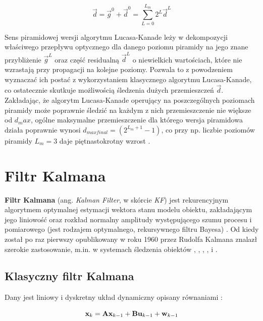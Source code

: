 \begin{equation}
\label{Piramidowy_algorytm_Lucasa_Kanade_wynik_koncowy}
	\vec{d} = \vec{g}^0 + \vec{d}^0 = \sum_{L = 0}^{L_m} 2^L \vec{d}^L
\end{equation}

Sens piramidowej wersji algorytmu Lucasa-Kanade leży w dekompozycji właściwego przepływu optycznego dla danego poziomu piramidy na jego znane przybliżenie $\vec{g}^L$ oraz część residualną $\vec{d}^L$ o niewielkich wartościach, które nie wzrastają przy propagacji na kolejne poziomy. Pozwala to z powodzeniem wyznaczać ich postać z wykorzystaniem klasycznego algorytmu Lucasa-Kanade, co ostatecznie skutkuje możliwością śledzenia dużych przemieszczeń $\vec{d}$. Zakładając, że algorytm Lucasa-Kanade operujący na poszczególnych poziomach piramidy może poprawnie śledzić na każdym z nich  przemieszczenie nie większe od $d_max$, ogólne maksymalne przemieszczenie dla którego wersja piramidowa działa poprawnie wynosi $d_{max final} = (2^{L_m+1}-1)$, co przy np. liczbie poziomów piramidy $L_m = 3$ daje piętnastokrotny wzrost \cite{Bouguet2000}.

\section{Filtr Kalmana}
\label{sec:Filtr_Kalmana}

\textbf{Filtr Kalmana} (ang. \textit{Kalman Filter}, w skórcie \textit{KF}) jest rekurencyjnym algorytmem optymalnej estymacji wektora stanu modelu obiektu, zakładającym jego liniowość oraz rozkład normalny amplitudy występującego szumu procesu i pomiarowego (jest rodzajem optymalnego, rekursywnego filtru Bayesa) \cite{Challa2011}. Od kiedy został po raz pierwszy opublikowany w roku 1960 przez Rudolfa Kalmana znalazł szerokie zastosowanie, m.in. w systemach śledzenia obiektów \cite{Campoy2009}, \cite{Chen2009}, \cite{Kim2012}, \cite{Rui2009}, \cite{Shibata2010} i \cite{Zhao2013}. 

\subsection{Klasyczny filtr Kalmana}
\label{subsec:Klasyczny_filtr_Kalmana}

Dany jest liniowy i dyskretny układ dynamiczny opisany równaniami \cite{Welch1995}:

\begin{equation}
\label{equ:Filtr_Kalmana_rownanie_procesu}
	\mathbf{x}_k = \mathbf{A} \mathbf{x}_{k-1} + \mathbf{B} \mathbf{u}_{k - 1} + \mathbf{w}_{k-1}
\end{equation}

